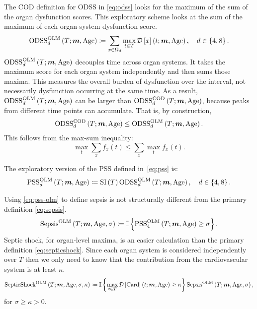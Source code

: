 \documentclass[letterpaper,10pt]{article}
\begin{document}
The COD definition for ODSS in \eqref{eq:odss} looks for the maximum of the
sum of the organ dysfunction scores. This exploratory scheme looks at the sum
of the maximum of each organ-system dysfunction score.
\begin{equation}
  \label{eq:odss-olm}
  \ODSS{d}[OLM] \coloneqq
  \sum_{x \in \Omega_{d}} \maxtinT \DS*{x},
  \quad d \in \left\{4, 8\right\}.
\end{equation}
$\ODSS{d}[OLM]$ decouples time across organ systems. It takes the
maximum score for each organ system independently and then sums those maxima.
This measures the overall burden of dysfunction over the interval, not
necessarily dysfunction occurring at the same time. As a result,
$\ODSS{d}[OLM]$ can be larger than $\ODSS{d}[COD]$, because peaks
from different time points can accumulate. That is, by construction,
\begin{equation}
  \label{eq:odss-olm-bound}
  \ODSS{d}[COD] \leq \ODSS{d}[OLM].
\end{equation}
This follows from the max-sum inequality:
\begin{equation}
  \label{eq:max-sum-inequality}
  \max_t \sum_x f_x(t) \leq \sum_x \max_t f_x (t).
\end{equation}

The exploratory version of the PSS defined in~\eqref{eq:pss} is:
\begin{equation}
  \label{eq:pss-olm}
  \PSS{d}[OLM] \coloneqq \SI \ODSS{d}[OLM], \quad d \in \left\{4, 8\right\}.
\end{equation}

Using \eqref{eq:pss-olm} to define sepsis is not structurally different from the
primary definition \eqref{eq:sepsis}.
\begin{equation}
  \label{eq:sepsis-olm}
  \Sepsis[OLM] \coloneqq
  \mathbb{I} \left\{\PSS{4}[OLM] \geq \sigma \right\}.
\end{equation}
Septic shock, for organ-level maxima, is an easier calculation than the primary
definition \eqref{eq:septicshock}.  Since each organ system is considered
independently over $T$ then we only need to know that the contribution from the
cardiovascular system is at least $\kappa.$
\begin{equation}
  \label{eq:septicshock-olm}
  \SepticShock[OLM] \coloneqq
  \mathbb{I} \left\{ \maxtinT \DS{Card} \geq \kappa\right\}
  \Sepsis[OLM],
\end{equation}
for $\sigma \geq \kappa > 0.$
\end{document}
